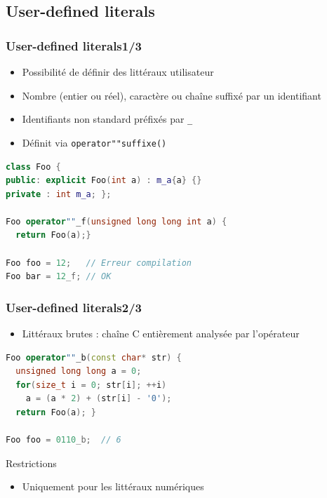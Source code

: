 \documentclass[C++.tex]{subfiles}
\begin{document}
\subsection*{User-defined literals}
\begin{frame}[fragile]
	\frametitle{User-defined literals\titlehfill{}1/3}
	\begin{itemize}
		\item Possibilité de définir des littéraux \og utilisateur\fg{}
		\item Nombre (entier ou réel), caractère ou chaîne suffixé par un identifiant
		\item Identifiants non standard préfixés par \lstinline|_|


		\item Définit via \lstinline|operator""suffixe()|
	\end{itemize}

	\begin{lstlisting}[language=C++]
class Foo {
public: explicit Foo(int a) : m_a{a} {}
private : int m_a; };

Foo operator""_f(unsigned long long int a) {
  return Foo(a);}

Foo foo = 12;   // Erreur compilation
Foo bar = 12_f; // OK\end{lstlisting}

\end{frame}

\begin{frame}[fragile]
	\frametitle{User-defined literals\titlehfill{}2/3}
	\begin{itemize}
		\item Littéraux brutes : chaîne C entièrement analysée par l'opérateur
	\end{itemize}
	
\begin{lstlisting}[language=C++]
Foo operator""_b(const char* str) {
  unsigned long long a = 0;
  for(size_t i = 0; str[i]; ++i)
    a = (a * 2) + (str[i] - '0');
  return Foo(a); }
		
Foo foo = 0110_b;  // 6\end{lstlisting}

	\begin{alertblock}{Restrictions}
		\begin{itemize}
			\item Uniquement pour les littéraux numériques
		\end{itemize}
	\end{alertblock}
\end{frame}
\end{document}
